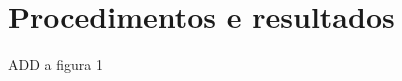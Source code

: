 \setcounter{topnumber}{5}
\setcounter{bottomnumber}{5}
\setcounter{totalnumber}{5}

\chapter{Procedimentos e resultados}

	
	ADD a figura 1

